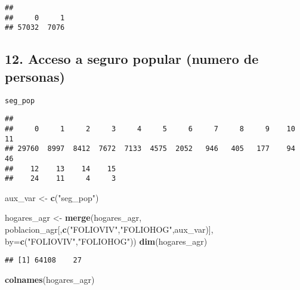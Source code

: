 \documentclass[11pt,]{article}
\newenvironment{Shaded}{\begin{snugshade}}{\end{snugshade}}
\newcommand{\KeywordTok}[1]{\textcolor[rgb]{0.13,0.29,0.53}{\textbf{#1}}}
\newcommand{\DataTypeTok}[1]{\textcolor[rgb]{0.13,0.29,0.53}{#1}}
\newcommand{\StringTok}[1]{\textcolor[rgb]{0.31,0.60,0.02}{#1}}
\newcommand{\CommentTok}[1]{\textcolor[rgb]{0.56,0.35,0.01}{\textit{#1}}}
\newcommand{\OperatorTok}[1]{\textcolor[rgb]{0.81,0.36,0.00}{\textbf{#1}}}
\newcommand{\NormalTok}[1]{#1}
\begin{document}
\begin{verbatim}
## 
##     0     1 
## 57032  7076
\end{verbatim}

\subsection{12. Acceso a seguro popular (numero de
personas)}\label{acceso-a-seguro-popular-numero-de-personas}

\texttt{seg\_pop}

\begin{Shaded}
\end{Shaded}

\begin{verbatim}
## 
##     0     1     2     3     4     5     6     7     8     9    10    11 
## 29760  8997  8412  7672  7133  4575  2052   946   405   177    94    46 
##    12    13    14    15 
##    24    11     4     3
\end{verbatim}

\begin{Shaded}
\begin{Highlighting}[]
\NormalTok{aux_var <-}\StringTok{ }\KeywordTok{c}\NormalTok{(}\StringTok{"seg_pop"}\NormalTok{)}

\NormalTok{hogares_agr <-}\StringTok{ }\KeywordTok{merge}\NormalTok{(hogares_agr,}
\NormalTok{                     poblacion_agr[,}\KeywordTok{c}\NormalTok{(}\StringTok{"FOLIOVIV"}\NormalTok{,}\StringTok{"FOLIOHOG"}\NormalTok{,aux_var)],}
                     \DataTypeTok{by=}\KeywordTok{c}\NormalTok{(}\StringTok{"FOLIOVIV"}\NormalTok{,}\StringTok{"FOLIOHOG"}\NormalTok{))}
\KeywordTok{dim}\NormalTok{(hogares_agr)}
\end{Highlighting}
\end{Shaded}

\begin{verbatim}
## [1] 64108    27
\end{verbatim}

\begin{Shaded}
\begin{Highlighting}[]
\KeywordTok{colnames}\NormalTok{(hogares_agr)}
\end{Highlighting}
\end{Shaded}
\end{document}

